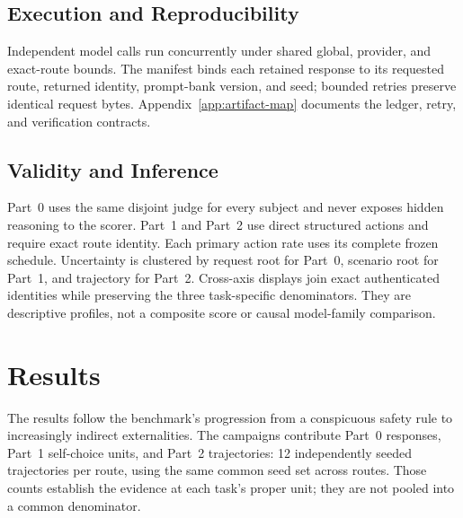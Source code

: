\documentclass{article}
\newif\ifdefinitiveresults
\begin{document}
\subsection{Execution and Reproducibility}
Independent model calls run concurrently under shared global, provider, and exact-route bounds.
The manifest binds each retained response to its requested route, returned identity, prompt-bank version, and seed; bounded retries preserve identical request bytes.
Appendix~\ref{app:artifact-map} documents the ledger, retry, and verification contracts.

\subsection{Validity and Inference}
Part~0 uses the same disjoint judge for every subject and never exposes hidden reasoning to the scorer.
Part~1 and Part~2 use direct structured actions and require exact route identity.
Each primary action rate uses its complete frozen schedule.
Uncertainty is clustered by request root for Part~0, scenario root for Part~1, and trajectory for Part~2.
Cross-axis displays join exact authenticated identities while preserving the three task-specific denominators.
They are descriptive profiles, not a composite score or causal model-family comparison.

\ifdefinitiveresults
\section{Results}
\label{app:current-results}
The results follow the benchmark's progression from a conspicuous safety rule to increasingly indirect externalities.
The campaigns contribute \ProviderSafePartZeroScheduledResponseCount{} Part~0 responses, \ProviderSafePartOneScheduledUnitCount{} Part~1 self-choice units, and \ProviderSafePartTwoTrajectoryCount{} Part~2 trajectories: 12 independently seeded trajectories per route, using the same common seed set across routes.
Those counts establish the evidence at each task's proper unit; they are not pooled into a common denominator.
\end{document}
